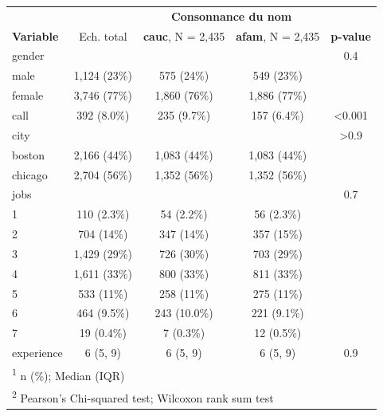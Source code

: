 \documentclass[
  11pt,
]{book}
\numberwithin{equation}{section}
\numberwithin{countremarque}{section}
\begin{document}
\begin{longtable}{lcccc}
\toprule
\multicolumn{2}{c}{ } & \multicolumn{2}{c}{\textbf{Consonnance du nom}} & \multicolumn{1}{c}{ } \\
\cmidrule(l{3pt}r{3pt}){3-4}
\textbf{Variable} & Ech. total & \textbf{cauc}, N = 2,435 & \textbf{afam}, N = 2,435 & \textbf{p-value}\\
\midrule
gender &  &  &  & 0.4\\
\hspace{1em}male & 1,124 (23\%) & 575 (24\%) & 549 (23\%) & \\
\hspace{1em}female & 3,746 (77\%) & 1,860 (76\%) & 1,886 (77\%) & \\
call & 392 (8.0\%) & 235 (9.7\%) & 157 (6.4\%) & <0.001\\
city &  &  &  & >0.9\\
\addlinespace
\hspace{1em}boston & 2,166 (44\%) & 1,083 (44\%) & 1,083 (44\%) & \\
\hspace{1em}chicago & 2,704 (56\%) & 1,352 (56\%) & 1,352 (56\%) & \\
jobs &  &  &  & 0.7\\
\hspace{1em}1 & 110 (2.3\%) & 54 (2.2\%) & 56 (2.3\%) & \\
\hspace{1em}2 & 704 (14\%) & 347 (14\%) & 357 (15\%) & \\
\addlinespace
\hspace{1em}3 & 1,429 (29\%) & 726 (30\%) & 703 (29\%) & \\
\hspace{1em}4 & 1,611 (33\%) & 800 (33\%) & 811 (33\%) & \\
\hspace{1em}5 & 533 (11\%) & 258 (11\%) & 275 (11\%) & \\
\hspace{1em}6 & 464 (9.5\%) & 243 (10.0\%) & 221 (9.1\%) & \\
\hspace{1em}7 & 19 (0.4\%) & 7 (0.3\%) & 12 (0.5\%) & \\
\addlinespace
experience & 6 (5, 9) & 6 (5, 9) & 6 (5, 9) & 0.9\\
\bottomrule
\multicolumn{5}{l}{\rule{0pt}{1em}\textsuperscript{1} n (\%); Median (IQR)}\\
\multicolumn{5}{l}{\rule{0pt}{1em}\textsuperscript{2} Pearson's Chi-squared test; Wilcoxon rank sum test}\\
\end{longtable}
\end{document}
